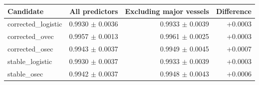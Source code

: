 \begin{tabular}{lrrr}
\toprule
Candidate & All predictors & Excluding major vessels & Difference \\
\midrule
corrected\_logistic & 0.9930 $\pm$ 0.0036 & 0.9933 $\pm$ 0.0039 & +0.0003 \\
corrected\_ovec & 0.9957 $\pm$ 0.0013 & 0.9961 $\pm$ 0.0025 & +0.0003 \\
corrected\_osec & 0.9943 $\pm$ 0.0037 & 0.9949 $\pm$ 0.0045 & +0.0007 \\
stable\_logistic & 0.9930 $\pm$ 0.0037 & 0.9933 $\pm$ 0.0039 & +0.0003 \\
stable\_osec & 0.9942 $\pm$ 0.0037 & 0.9948 $\pm$ 0.0043 & +0.0006 \\
\bottomrule
\end{tabular}
